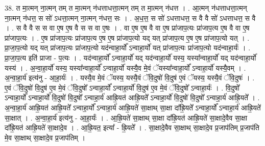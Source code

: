 \documentclass[17pt]{extarticle}
\begin{document}
38. त मा॒त्मन् ना॒त्मन् तम् त मा॒त्मन् न॑धत्ताधत्ता॒त्मन् तम् त मा॒त्मन् न॑धत्त । . आ॒त्मन् न॑धत्ताधत्ता॒त्मन् ना॒त्मन् न॑धत्त॒ स सो॑ ऽधत्ता॒त्मन् ना॒त्मन् न॑धत्त॒ सः । . अ॒ध॒त्त॒ स सो॑ ऽधत्ताधत्त॒ स वै वै सो॑ ऽधत्ताधत्त॒ स वै । . स वै वै स स वा ए॒ष ए॒ष वै स स वा ए॒षः । . वा ए॒ष ए॒ष वै वा ए॒ष प्रा॑जाप॒त्यः प्रा॑जाप॒त्य ए॒ष वै वा ए॒ष प्रा॑जाप॒त्यः । . ए॒ष प्रा॑जाप॒त्यः प्रा॑जाप॒त्य ए॒ष ए॒ष प्रा॑जाप॒त्यो यद् यत् प्रा॑जाप॒त्य ए॒ष ए॒ष प्रा॑जाप॒त्यो यत् । . प्रा॒जा॒प॒त्यो यद् यत् प्रा॑जाप॒त्यः प्रा॑जाप॒त्यो यद॑न्वाहा॒र्यो᳚ ऽन्वाहा॒र्यो॑ यत् प्रा॑जाप॒त्यः प्रा॑जाप॒त्यो यद॑न्वाहा॒र्यः॑ । . प्रा॒जा॒प॒त्य इति॑ प्राजा - प॒त्यः । . यद॑न्वाहा॒र्यो᳚ ऽन्वाहा॒र्यो॑ यद् यद॑न्वाहा॒र्यो॑ यस्य॒ यस्या᳚न्वाहा॒र्यो॑ यद् यद॑न्वाहा॒र्यो॑ यस्य॑ । . अ॒न्वा॒हा॒र्यो॑ यस्य॒ यस्या᳚न्वाहा॒र्यो᳚ ऽन्वाहा॒र्यो॑ यस्यै॒व मे॒वं ॅयस्या᳚न्वाहा॒र्यो᳚ ऽन्वाहा॒र्यो॑ यस्यै॒वम् । . अ॒न्वा॒हा॒र्य॑ इत्य॑नु - आ॒हा॒र्यः॑ । . यस्यै॒व मे॒वं ॅयस्य॒ यस्यै॒वं ॅवि॒दुषो॑ वि॒दुष॑ ए॒वं ॅयस्य॒ यस्यै॒वं ॅवि॒दुषः॑ । . ए॒वं ॅवि॒दुषो॑ वि॒दुष॑ ए॒व मे॒वं ॅवि॒दुषो᳚ ऽन्वाहा॒र्यो᳚ ऽन्वाहा॒र्यो॑ वि॒दुष॑ ए॒व मे॒वं ॅवि॒दुषो᳚ ऽन्वाहा॒र्यः॑ । . वि॒दुषो᳚ ऽन्वाहा॒र्यो᳚ ऽन्वाहा॒र्यो॑ वि॒दुषो॑ वि॒दुषो᳚ ऽन्वाहा॒र्य॑ आह्रि॒यत॑ आह्रि॒यते᳚ ऽन्वाहा॒र्यो॑ वि॒दुषो॑ वि॒दुषो᳚ ऽन्वाहा॒र्य॑ आह्रि॒यते᳚ । . अ॒न्वा॒हा॒र्य॑ आह्रि॒यत॑ आह्रि॒यते᳚ ऽन्वाहा॒र्यो᳚ ऽन्वाहा॒र्य॑ आह्रि॒यते॑ सा॒क्षाथ् सा॒क्षा दा᳚ह्रि॒यते᳚ ऽन्वाहा॒र्यो᳚ ऽन्वाहा॒र्य॑ आह्रि॒यते॑ सा॒क्षात् । . अ॒न्वा॒हा॒र्य॑ इत्य॑नु - आ॒हा॒र्यः॑ । . आ॒ह्रि॒यते॑ सा॒क्षाथ् सा॒क्षा दा᳚ह्रि॒यत॑ आह्रि॒यते॑ सा॒क्षादे॒वैव सा॒क्षा दा᳚ह्रि॒यत॑ आह्रि॒यते॑ सा॒क्षादे॒व । . आ॒ह्रि॒यत॒ इत्या᳚ - ह्रि॒यते᳚ । . सा॒क्षादे॒वैव सा॒क्षाथ् सा॒क्षादे॒व प्र॒जाप॑तिम् प्र॒जाप॑ति मे॒व सा॒क्षाथ् सा॒क्षादे॒व प्र॒जाप॑तिम् । \newline
\end{document}
